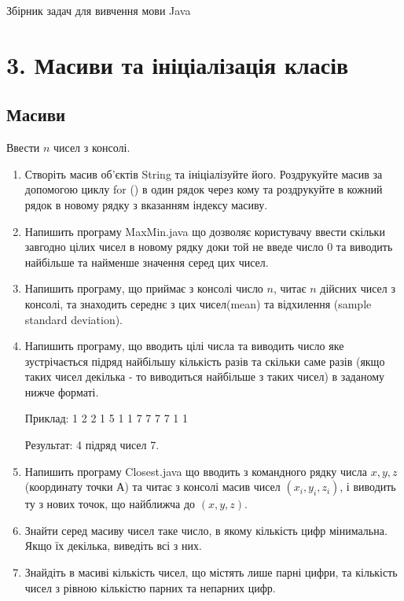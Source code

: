 \documentclass[]{article}
\date{}
\begin{document}
Збірник задач для вивчення мови Java


\section{3. Масиви та ініціалізація класів}

 \subsection{Масиви}


Ввести $n$ чисел з консолі.
\begin{enumerate}
\def\labelenumi{1.\arabic{enumi}.}

\item
 Створіть масив об'єктів String та ініціалізуйте його. Роздрукуйте масив за допомогою циклу for () в один рядок через кому
 та роздрукуйте в кожний рядок в новому рядку з вказанням індексу масиву.

\item
Напишить програму MaxMin.java що дозволяє користувачу ввести скільки завгодно цілих чисел в новому рядку доки той не введе число 0 та виводить найбільше та найменше значення серед цих чисел. 

\item
 Напишить програму, що приймає з консолі число $n$, читає $n$ дійсних чисел з консолі, та знаходить середнє з цих чисел(mean) та відхилення (sample standard deviation). 
\item
 Напишить програму, що вводить цілі числа та виводить число яке зустрічається підряд найбільшу кількість разів та скільки саме разів (якщо таких чисел декілька - то виводиться найбільше з таких чисел) в заданому нижче форматі. 

Приклад:  1 2 2 1 5 1 1 7 7 7 7 1 1
 
Результат: 4 підряд чисел 7. 

\item
 Напишить програму  Closest.java що вводить з командного рядку числа $x,y,z$ (координату точки А) та читає з консолі масив чисел 
$(x_i,y_i,z_i)$, і виводить ту з нових точок, що найближча до $(x,y,z)$. 

\item
 Знайти серед масиву чисел таке число, в якому кількість цифр мінимальна. Якщо їх декілька, виведіть всі з них.

\item Знайдіть в масиві кількість чисел, що містять лише парні цифри, та кількість чисел з рівною кількістю парних та непарних цифр.


\end{enumerate}
\end{document}
